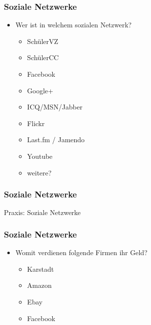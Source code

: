 \documentclass[12pt]{beamer}
\begin{document}
\begin{frame}
  \frametitle{Soziale Netzwerke}

  \begin{itemize}
    \item Wer ist in welchem sozialen Netzwerk?
      \begin{itemize}
        \item SchülerVZ
        \item SchülerCC
        \item Facebook
        \item Google+
        \item ICQ/MSN/Jabber
        \item Flickr
        \item Last.fm / Jamendo
        \item Youtube
        \item weitere?
      \end{itemize}
  \end{itemize}
\end{frame}

\begin{frame}
  \frametitle{Soziale Netzwerke}

  \begin{center} \Large
    Praxis: Soziale Netzwerke 
  \end{center}
\end{frame}

\begin{frame}
  \frametitle{Soziale Netzwerke}

  \begin{itemize}
    \item Womit verdienen folgende Firmen ihr Geld?
      \begin{itemize}
        \item<2-> Karstadt
        \item<3-> Amazon
        \item<4-> Ebay
        \item<5-> Facebook
      \end{itemize}
  \end{itemize}
\end{frame}
\end{document}

